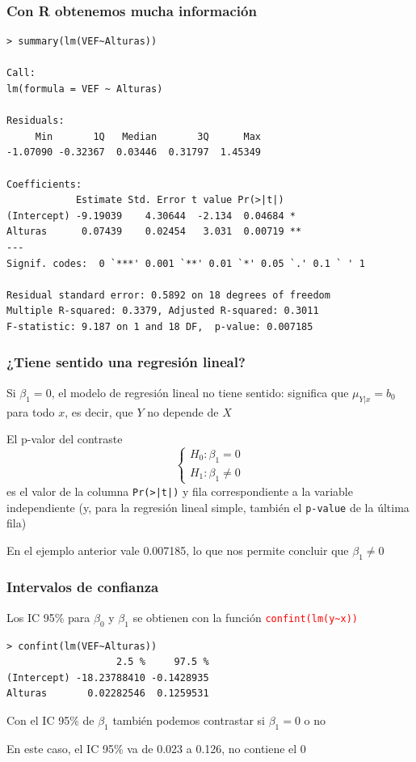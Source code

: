 \documentclass[12pt,t]{beamer}
\newcommand{\red}[1]{\textcolor{red}{#1}}
\theoremstyle{plain}
\theoremstyle{definition}
\begin{document}
\begin{frame}[fragile]
\frametitle{Con R obtenemos mucha información}

\begin{lstlisting}[style=petit]
> summary(lm(VEF~Alturas))

Call:
lm(formula = VEF ~ Alturas)

Residuals:
     Min       1Q   Median       3Q      Max 
-1.07090 -0.32367  0.03446  0.31797  1.45349 

Coefficients:
            Estimate Std. Error t value Pr(>|t|)   
(Intercept) -9.19039    4.30644  -2.134  0.04684 * 
Alturas      0.07439    0.02454   3.031  0.00719 **
---
Signif. codes:  0 `***' 0.001 `**' 0.01 `*' 0.05 `.' 0.1 ` ' 1

Residual standard error: 0.5892 on 18 degrees of freedom
Multiple R-squared: 0.3379, Adjusted R-squared: 0.3011 
F-statistic: 9.187 on 1 and 18 DF,  p-value: 0.007185
\end{lstlisting}

\end{frame}


\begin{frame}
\frametitle{¿Tiene sentido una regresión lineal?}

Si $\beta_1=0$,  el modelo de regresión lineal no tiene sentido: significa que $\mu_{Y|x}=b_0$ para todo $x$, es decir, que $Y$ no depende de $X$\medskip

El p-valor del contraste 
$$
\left\{\begin{array}{l}
H_0:\beta_1=0\\
H_1:\beta_1 \neq 0
\end{array}
\right.
$$
es el valor de la columna \texttt{Pr(>|t|)} y fila correspondiente a la variable independiente (y, para la regresión lineal simple, también el \texttt{p-value} de la última fila)\medskip

En el ejemplo anterior vale 0.007185, lo que nos permite concluir que $\beta_1 \neq 0$



\end{frame}




\begin{frame}[fragile]
\frametitle{Intervalos de confianza}
Los IC 95\% para $\beta_0$ y $\beta_1$ se obtienen con la función \red{\tt confint(lm(y\~{}x))}\medskip

\begin{lstlisting}
> confint(lm(VEF~Alturas))
                   2.5 %     97.5 %
(Intercept) -18.23788410 -0.1428935
Alturas       0.02282546  0.1259531
\end{lstlisting}

Con el IC 95\% de $\beta_1$ también podemos contrastar si $\beta_1=0$ o no\medskip

En este caso, el IC 95\% va de 0.023 a 0.126, no contiene el 0
\end{frame}
\end{document}
